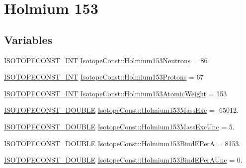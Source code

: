 \hypertarget{group___isotope_const-_holmium-_ho153}{}\section{Holmium 153}
\label{group___isotope_const-_holmium-_ho153}
\subsection*{Variables}
\begin{DoxyCompactItemize}
\item 
\mbox{\hyperlink{group___isotope_const-_macros_ga5f18360b3e99483a35c32d789e62621c}{I\+S\+O\+T\+O\+P\+E\+C\+O\+N\+S\+T\+\_\+\+I\+NT}} \mbox{\hyperlink{group___isotope_const-_holmium-_ho153_gae8bf3b3fd39c0fbdbe924a8b9b5a377e}{Isotope\+Const\+::\+Holmium153\+Neutrons}} = 86
\item 
\mbox{\hyperlink{group___isotope_const-_macros_ga5f18360b3e99483a35c32d789e62621c}{I\+S\+O\+T\+O\+P\+E\+C\+O\+N\+S\+T\+\_\+\+I\+NT}} \mbox{\hyperlink{group___isotope_const-_holmium-_ho153_ga0e77d9c97c2af0f450efe35fa2ef4112}{Isotope\+Const\+::\+Holmium153\+Protons}} = 67
\item 
\mbox{\hyperlink{group___isotope_const-_macros_ga5f18360b3e99483a35c32d789e62621c}{I\+S\+O\+T\+O\+P\+E\+C\+O\+N\+S\+T\+\_\+\+I\+NT}} \mbox{\hyperlink{group___isotope_const-_holmium-_ho153_ga7c0836314c2aeac1c1a87da70ba477e2}{Isotope\+Const\+::\+Holmium153\+Atomic\+Weight}} = 153
\item 
\mbox{\hyperlink{group___isotope_const-_macros_ga8f45a7272ce02c0b4c65c44636ed719a}{I\+S\+O\+T\+O\+P\+E\+C\+O\+N\+S\+T\+\_\+\+D\+O\+U\+B\+LE}} \mbox{\hyperlink{group___isotope_const-_holmium-_ho153_gaf0d3a336f34ca26b66b147a7b818a21b}{Isotope\+Const\+::\+Holmium153\+Mass\+Exc}} = -\/65012.
\item 
\mbox{\hyperlink{group___isotope_const-_macros_ga8f45a7272ce02c0b4c65c44636ed719a}{I\+S\+O\+T\+O\+P\+E\+C\+O\+N\+S\+T\+\_\+\+D\+O\+U\+B\+LE}} \mbox{\hyperlink{group___isotope_const-_holmium-_ho153_gacecea587dadcd83c8ccc2d83d629ff38}{Isotope\+Const\+::\+Holmium153\+Mass\+Exc\+Unc}} = 5.
\item 
\mbox{\hyperlink{group___isotope_const-_macros_ga8f45a7272ce02c0b4c65c44636ed719a}{I\+S\+O\+T\+O\+P\+E\+C\+O\+N\+S\+T\+\_\+\+D\+O\+U\+B\+LE}} \mbox{\hyperlink{group___isotope_const-_holmium-_ho153_ga6fc3c0ad1b8123e83e82e8e95c06de17}{Isotope\+Const\+::\+Holmium153\+Bind\+E\+PerA}} = 8153.
\item 
\mbox{\hyperlink{group___isotope_const-_macros_ga8f45a7272ce02c0b4c65c44636ed719a}{I\+S\+O\+T\+O\+P\+E\+C\+O\+N\+S\+T\+\_\+\+D\+O\+U\+B\+LE}} \mbox{\hyperlink{group___isotope_const-_holmium-_ho153_gaf5a2c5a4b76bc914ad12cff7340840c2}{Isotope\+Const\+::\+Holmium153\+Bind\+E\+Per\+A\+Unc}} = 0.

\end{DoxyCompactItemize}
